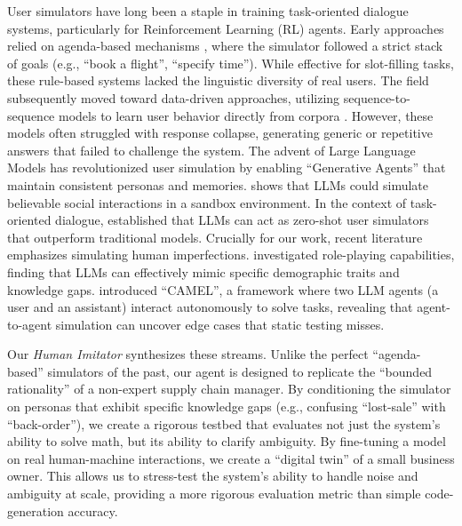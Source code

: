 \documentclass[mnsc,nonblindrev]{informs3_hide}
\begin{document}
User simulators have long been a staple in training task-oriented dialogue systems, particularly for Reinforcement Learning (RL) agents. Early approaches relied on agenda-based mechanisms \citep{schatzmann2007agenda}, where the simulator followed a strict stack of goals (e.g., ``book a flight'', ``specify time''). While effective for slot-filling tasks, these rule-based systems lacked the linguistic diversity of real users. The field subsequently moved toward data-driven approaches, utilizing sequence-to-sequence models to learn user behavior directly from corpora \citep{kreyssig2018neural, shi2019build}. However, these models often struggled with response collapse, generating generic or repetitive answers that failed to challenge the system.
The advent of Large Language Models has revolutionized user simulation by enabling ``Generative Agents'' that maintain consistent personas and memories. \cite{park2023generative} shows that LLMs could simulate believable social interactions in a sandbox environment. In the context of task-oriented dialogue, \cite{wang2025user} established that LLMs can act as zero-shot user simulators that outperform traditional models.
Crucially for our work, recent literature emphasizes simulating human imperfections. \cite{wang2024incharacter} investigated role-playing capabilities, finding that LLMs can effectively mimic specific demographic traits and knowledge gaps. \cite{li2023camel} introduced ``CAMEL'', a framework where two LLM agents (a user and an assistant) interact autonomously to solve tasks, revealing that agent-to-agent simulation can uncover edge cases that static testing misses.

Our \emph{Human Imitator} synthesizes these streams. Unlike the perfect ``agenda-based'' simulators of the past, our agent is designed to replicate the ``bounded rationality'' \citep{simon1955behavioral} of a non-expert supply chain manager. By conditioning the simulator on personas that exhibit specific knowledge gaps (e.g., confusing ``lost-sale'' with ``back-order''), we create a rigorous testbed that evaluates not just the system's ability to solve math, but its ability to clarify ambiguity. By fine-tuning a model on real human-machine interactions, we create a ``digital twin'' of a small business owner. This allows us to stress-test the system's ability to handle noise and ambiguity at scale, providing a more rigorous evaluation metric than simple code-generation accuracy.

        
\end{document}
